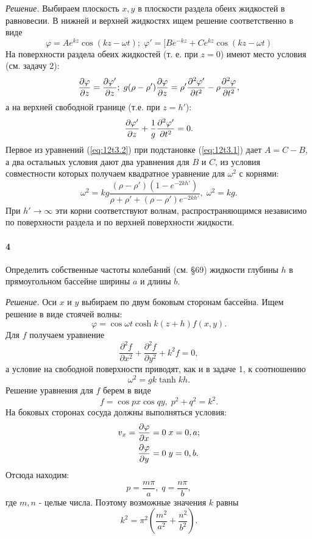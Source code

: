 \textit{Решение.}
Выбираем плоскость $x,y$ в плоскости раздела обеих жидкостей в равновесии. В
нижней и верхней жидкостях ищем решение соответственно в виде
\begin{equation}
\label{eq:12t3.1}
   \varphi  = A e^{kz} \cos (kz - \omega t); \;
   \varphi' = \lbrack B e^{-kz} + C e^{kz} \cos (kz - \omega t)
\end{equation}
На поверхности раздела обеих жидкостей (т. е. при $z = 0$) имеют место условия
(см. задачу 2):
\begin{equation}
\label{eq:12t3.2}
   \frac{\partial{\varphi}}{\partial{z}} = \frac{\partial{\varphi'}}{\partial{z}};\;
   g(\rho - \rho') \frac{\partial{\varphi}}{\partial{z}} = \rho'\frac{\partial{^2\varphi'}}{\partial{t^2}} - \rho\frac{\partial{^2\varphi}}{\partial{t^2}},
\end{equation}
а на верхней свободной границе (т.е. при $z = h'$):
\begin{equation}
\label{eq:12t3.3}
\frac{\partial{\varphi'}}{\partial{z}} + \frac1{g}\frac{\partial{^2\varphi'}}{\partial{t^2}} = 0.
\end{equation}
Первое из уравнений (\ref{eq:12t3.2}) при подстановке (\ref{eq:12t3.1}) дает $A = C - B$, а два остальных
условия дают два уравнения для $B$ и $C$, из условия совместности которых
получаем квадратное уравнение для $\omega^2$ с корнями:
\[
   \omega^2 = kg \frac{(\rho - \rho')(1-e^{-2kh'})}{\rho + \rho' + (\rho - \rho')e^{-2kh'}},\; \omega^2 = kg.
\]
При $h' \to \infty$ эти корни соответствуют волнам, распространяющимся
независимо по поверхности раздела и по верхней поверхности жидкости.



\paragraph*{4} Определить собственные частоты колебаний (см. \S69) жидкости
глубины $h$ в прямоугольном бассейне ширины $a$ и длииы $b$.

\textit{Решение.} Оси $x$ и $y$ выбираем по двум боковым сторонам бассейна. Ищем
решение в виде стоячей волны:
\[
   \varphi = \cos \omega t \cosh k(z+h) f(x,y).
\]
Для $f$ получаем уравнение
\[
   \frac{\partial^2 f}{\partial x^2} + \frac{\partial^2 f}{\partial y^2} + k^2 f = 0,
\]
а условие на свободной поверхности приводят, как и в задаче 1, к соотношению
\[
   \omega^2 = gk \tanh kh.
\]
Решение уравнения для $f$ берем в виде
\[
   f = \cos px \cos qy, \; p^2 + q^2 = k^2.
\]
На боковых сторонах сосуда должны выполняться условия:
\begin{eqnarray}
   v_x = \frac{\partial{\varphi}}{\partial{x}} = 0\;& x = 0,a; \nonumber \\
         \frac{\partial{\varphi}}{\partial{y}} = 0\;& y = 0,b. \nonumber
\end{eqnarray}
Отсюда находим:
\[
   p = \frac{m\pi}{a},\; q = \frac{n\pi}{b},
\]
где $m,n$ - целые числа. Поэтому возможные значения $k$ равны
\[
   k^2 = \pi^2 \left( \frac{m^2}{a^2} + \frac{n^2}{b^2} \right).
\]


